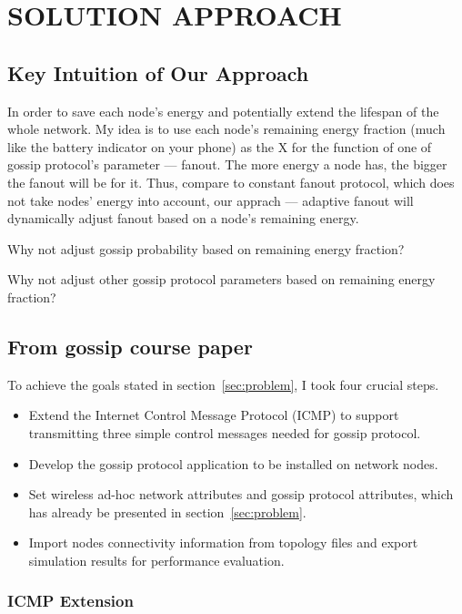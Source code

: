 \chapter{SOLUTION APPROACH}

\section{Key Intuition of Our Approach}

In order to save each node's energy and potentially extend the lifespan of the whole network. My idea is to use each node's remaining energy fraction (much like the battery indicator on your phone) as the X for the function of one of gossip protocol's parameter — fanout. The more energy a node has, the bigger the fanout will be for it. Thus, compare to constant fanout protocol, which does not take nodes' energy into account, our apprach — adaptive fanout will dynamically adjust fanout based on a node's remaining energy.

Why not adjust gossip probability based on remaining energy fraction?

Why not adjust other gossip protocol parameters based on remaining energy fraction?

\section{From gossip course paper}

To achieve the goals stated in section~\ref{sec:problem}, I took four crucial steps.

\begin{itemize}
	\item Extend the Internet Control Message Protocol (ICMP) to support transmitting three simple control messages needed for gossip protocol.
	\item Develop the gossip protocol application to be installed on network nodes.
	\item Set wireless ad-hoc network attributes and gossip protocol attributes, which has already be presented in section~\ref{sec:problem}.
	\item Import nodes connectivity information from topology files and export simulation results for performance evaluation.
\end{itemize}

\subsection{ICMP Extension}

